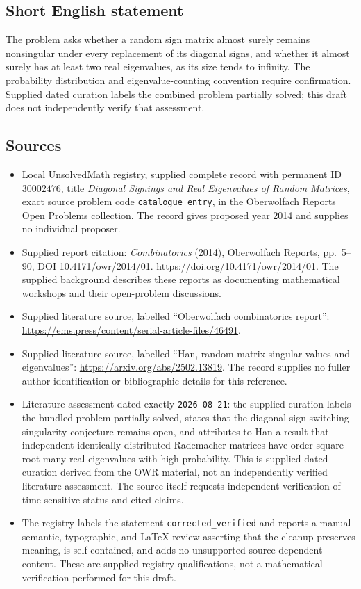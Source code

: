 \documentclass[11pt]{article}
\begin{document}
\subsection{Short English statement}
The problem asks whether a random sign matrix almost surely remains nonsingular under every replacement of its diagonal signs, and whether it almost surely has at least two real eigenvalues, as its size tends to infinity. The probability distribution and eigenvalue-counting convention require confirmation. Supplied dated curation labels the combined problem partially solved; this draft does not independently verify that assessment.
\subsection{Sources}
\begin{itemize}
\item Local UnsolvedMath registry, supplied complete record with permanent ID \(30002476\), title \emph{Diagonal Signings and Real Eigenvalues of Random Matrices}, exact source problem code \texttt{catalogue entry}, in the Oberwolfach Reports Open Problems collection. The record gives proposed year 2014 and supplies no individual proposer.
\item Supplied report citation: \emph{Combinatorics} (2014), Oberwolfach Reports, pp.~5--90, DOI 10.4171/owr/2014/01. \url{https://doi.org/10.4171/owr/2014/01}. The supplied background describes these reports as documenting mathematical workshops and their open-problem discussions.
\item Supplied literature source, labelled ``Oberwolfach combinatorics report'': \url{https://ems.press/content/serial-article-files/46491}.
\item Supplied literature source, labelled ``Han, random matrix singular values and eigenvalues'': \url{https://arxiv.org/abs/2502.13819}. The record supplies no fuller author identification or bibliographic details for this reference.
\item Literature assessment dated exactly \texttt{2026-08-21}: the supplied curation labels the bundled problem partially solved, states that the diagonal-sign switching singularity conjecture remains open, and attributes to Han a result that independent identically distributed Rademacher matrices have order-square-root-many real eigenvalues with high probability. This is supplied dated curation derived from the OWR material, not an independently verified literature assessment. The source itself requests independent verification of time-sensitive status and cited claims.
\item The registry labels the statement \texttt{corrected\_verified} and reports a manual semantic, typographic, and LaTeX review asserting that the cleanup preserves meaning, is self-contained, and adds no unsupported source-dependent content. These are supplied registry qualifications, not a mathematical verification performed for this draft.
\end{itemize}
\end{document}
